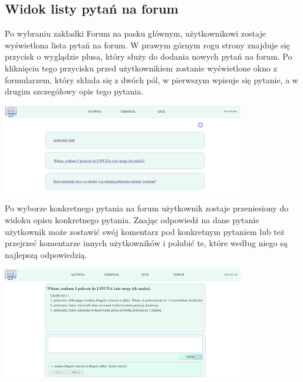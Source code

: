 \documentclass[10pt,a4paper]{report}
\begin{document}
\begin{adjustwidth}{2cm}{2cm}
\subsection{Widok listy pytań na forum}
\begin{minipage}{1\linewidth}
Po wybraniu zakładki Forum na pasku głównym, użytkownikowi zostaje wyświetlona lista pytań na forum. W prawym górnym rogu strony znajduje się przycisk o wyglądzie plusa, który służy do dodania nowych pytań na forum. Po kliknięciu tego przycisku przed użytkownikiem zostanie wyświetlone okno z formularzem, który składa się z dwóch pól, w pierwszym wpisuje się pytanie, a w drugim szczegółowy opis tego pytania. \\ 
\end{minipage}
\begin{minipage}{\linewidth}
\begin{center}
  \includegraphics[width=400px]{project/forum.png}
\end{center}
\end{minipage}
\begin{minipage}{1\linewidth}
\vspace{0.3cm}
Po wyborze konkretnego pytania na forum użytkownik zostaje przeniesiony do widoku opisu konkretnego pytania. Znając odpowiedź na dane pytanie użytkownik może zostawić swój komentarz pod konkretnym pytaniem lub też przejrzeć komentarze innych użytkowników i polubić te, które według niego są najlepszą odpowiedzią.\\
\end{minipage}
\begin{minipage}{\linewidth}
\begin{center}
  \includegraphics[width=400px]{project/quest_comment.png}
\end{center}
\end{minipage}

\end{adjustwidth}
\end{document}
